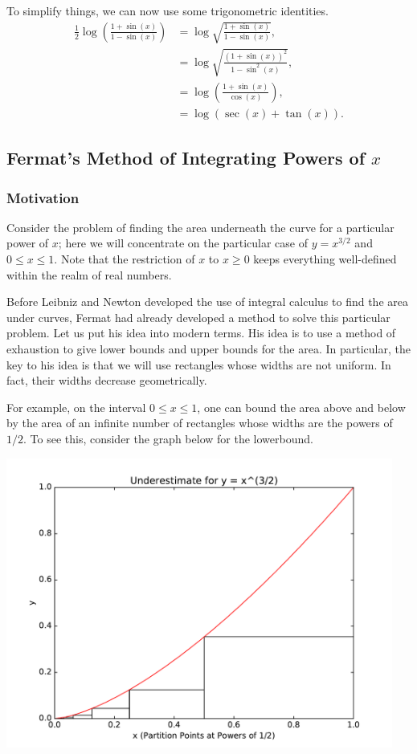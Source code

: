 To simplify things, we can now use some trigonometric identities.
\begin{align}
\frac{1}{2} \log\left(\frac{1 + \sin(x)}{1 - \sin(x)}\right) & = \log\sqrt{\frac{1 + \sin(x)}{1 - \sin(x)}}, \\
    & = \log\sqrt{\frac{(1 + \sin(x))^2}{1 - \sin^2(x)}}, \\
    & = \log\left(\frac{1 + \sin(x)}{\cos(x)}\right), \\
    & = \log(\sec(x) + \tan(x)).
\end{align}


\subsection{Fermat's Method of Integrating Powers of \(x\)}

\subsubsection*{Motivation}

Consider the problem of finding the area underneath the curve for a particular power of \(x\); here we will concentrate on the 
particular case of \(y = x^{3/2}\) and \(0 \leq x \leq 1\). Note that the restriction of \(x\) to \(x\geq 0\) keeps everything well-defined within
the realm of real numbers. 

Before Leibniz and Newton developed the use of integral calculus to find the area under curves, Fermat had already developed 
a method to solve this particular problem. Let us put his idea into modern terms. His idea is to use a method of exhaustion to 
give lower bounds and upper bounds for the area. In particular, the key to his idea is that we will use rectangles whose widths
are not uniform. In fact, their widths decrease geometrically. 

For example, on the interval \(0 \leq x \leq 1\), one can bound the area above and below by the area of an infinite number of rectangles whose widths
are the powers of \(1/2\). To see this, consider the graph below for the lowerbound.

\includegraphics[width = 5in]{oneVarIntCalc/fermatLower.pdf}

